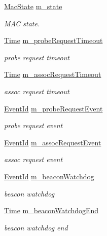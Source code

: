 \begin{DoxyCompactItemize}
\item 
\hyperlink{classns3_1_1StaWifiMac_a262848fcb2046037198bd36fa86fbd2c}{Mac\+State} \hyperlink{classns3_1_1StaWifiMac_aa5739fb8521d45d18509f066b6872e66}{m\+\_\+state}
\begin{DoxyCompactList}\small\item\em M\+AC state. \end{DoxyCompactList}\item 
\hyperlink{classns3_1_1Time}{Time} \hyperlink{classns3_1_1StaWifiMac_acd3c1903e18cd6b544fa4d373f970613}{m\+\_\+probe\+Request\+Timeout}
\begin{DoxyCompactList}\small\item\em probe request timeout \end{DoxyCompactList}\item 
\hyperlink{classns3_1_1Time}{Time} \hyperlink{classns3_1_1StaWifiMac_acac4078bfd17c0ecc1991b88fd97a242}{m\+\_\+assoc\+Request\+Timeout}
\begin{DoxyCompactList}\small\item\em assoc request timeout \end{DoxyCompactList}\item 
\hyperlink{classns3_1_1EventId}{Event\+Id} \hyperlink{classns3_1_1StaWifiMac_a9794c3204b184f30fe9b920ac099c7c7}{m\+\_\+probe\+Request\+Event}
\begin{DoxyCompactList}\small\item\em probe request event \end{DoxyCompactList}\item 
\hyperlink{classns3_1_1EventId}{Event\+Id} \hyperlink{classns3_1_1StaWifiMac_aeadb0ea670a79953896042cc2cc40c3d}{m\+\_\+assoc\+Request\+Event}
\begin{DoxyCompactList}\small\item\em assoc request event \end{DoxyCompactList}\item 
\hyperlink{classns3_1_1EventId}{Event\+Id} \hyperlink{classns3_1_1StaWifiMac_a29d88d8bf2db8f567f2accd273978c6d}{m\+\_\+beacon\+Watchdog}
\begin{DoxyCompactList}\small\item\em beacon watchdog \end{DoxyCompactList}\item 
\hyperlink{classns3_1_1Time}{Time} \hyperlink{classns3_1_1StaWifiMac_a1477e009fd4857fd9497d0a5104ab1e1}{m\+\_\+beacon\+Watchdog\+End}
\begin{DoxyCompactList}\small\item\em beacon watchdog end \end{DoxyCompactList}\item 

\end{DoxyCompactItemize}
